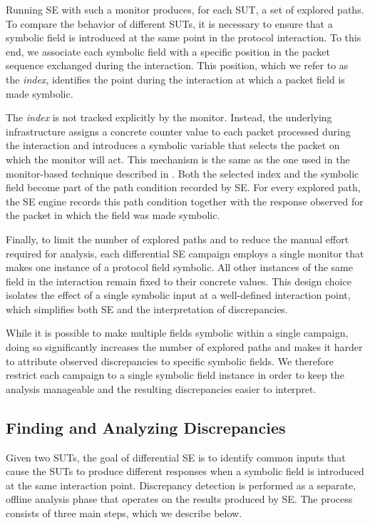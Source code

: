 Running SE with such a monitor produces, for each SUT, a set of explored paths.
To compare the behavior of different SUTs, it is necessary to ensure that a symbolic field is introduced at the same point in the protocol interaction.
To this end, we associate each symbolic field with a specific position in the packet sequence exchanged during the interaction.
This position, which we refer to as the \emph{index}, identifies the point during the interaction at which a packet field is made symbolic.

The \emph{index} is not tracked explicitly by the monitor.
Instead, the underlying infrastructure assigns a concrete counter value to each packet processed during the interaction and introduces a symbolic variable that selects the packet on which the monitor will act.
This mechanism is the same as the one used in the monitor-based technique described in .
Both the selected index and the symbolic field become part of the path condition recorded by SE.
For every explored path, the SE engine records this path condition together with the response observed for the packet in which the field was made symbolic.

Finally, to limit the number of explored paths and to reduce the manual effort required for analysis, each differential SE campaign employs a single monitor that makes one instance of a protocol field symbolic.
All other instances of the same field in the interaction remain fixed to their concrete values.
This design choice isolates the effect of a single symbolic input at a well-defined interaction point, which simplifies both SE and the interpretation of discrepancies.

While it is possible to make multiple fields symbolic within a single campaign, doing so significantly increases the number of explored paths and makes it harder to attribute observed discrepancies to specific symbolic fields.
We therefore restrict each campaign to a single symbolic field instance in order to keep the analysis manageable and the resulting discrepancies easier to interpret.

\subsection{Finding and Analyzing Discrepancies}\label{sec:meth-discrepancies}
Given two SUTs, the goal of differential SE is to identify common inputs that cause the SUTs to produce different responses when a symbolic field is introduced at the same interaction point.
Discrepancy detection is performed as a separate, offline analysis phase that operates on the results produced by SE.
The process consists of three main steps, which we describe below.

